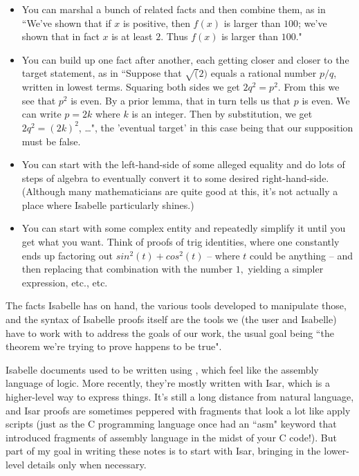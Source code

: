 \begin{itemize}
    \item 
You can marshal a bunch of related facts and then combine them, as in ``We've shown that if $x$ is positive, then $f(x)$ is larger than $100$; we've shown that in fact $x$ is at least $2$. Thus $f(x)$ is larger than $100.$" 
\item
You can build up one fact after another, each getting closer and closer to the target statement, as in ``Suppose that $\sqrt(2)$ equals a rational number $p/q$, written in lowest terms. Squaring both sides we get $2q^2 = p^2.$ From this we see that $p^2$ is even. By a prior lemma, that in turn tells us that $p$ is even. We can write $p = 2k$ where $k$ is an integer. Then by substitution, we get $2q^2 = (2k)^2$, \ldots", the 'eventual target' in this case being that our supposition must be false. 
\item
You can start with the left-hand-side of some alleged equality and do lots of steps of algebra to eventually convert it to some desired right-hand-side. (Although many mathematicians are quite good at this, it's not actually a place where Isabelle particularly shines.) 
\item 
You can start with some complex entity and repeatedly simplify it until you get what you want. Think of proofs of trig identities, where one constantly ends up factoring out $sin^2(t) + cos^2(t)$  -- where $t$ could be anything --  and then replacing that combination with the number $1,$ yielding a simpler expression, etc., etc.
\end{itemize}
The facts Isabelle has on hand, the various tools developed to manipulate those, and the syntax of Isabelle proofs itself are the tools we (the user and Isabelle) have to work with to address the goals of our work, the usual goal being ``the theorem we're trying to prove happens to be true". 

Isabelle documents used to be written using , which feel like the assembly language of logic. More recently, they're mostly written with Isar, which is a higher-level way to express things. It's still a long distance from natural language, and Isar proofs are sometimes peppered with fragments that look a lot like apply scripts (just as the C programming language once had an ``asm" keyword that introduced fragments of assembly language in the midst of your C code!). But part of my goal in writing these notes is to start with Isar, bringing in the lower-level details only when necessary. 

